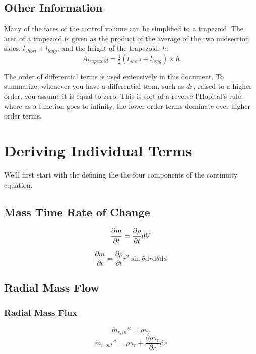 \documentclass[12pt, letterpaper, twoside]{article}
\makeatletter
\DeclareRobustCommand{\volume}{\text{\volumedash}V}
\newcommand{\volumedash}{%
  \makebox[0pt][l]{%
    \ooalign{\hfil\hphantom{$\m@th V$}\hfil\cr\kern0.08em--\hfil\cr}%
  }%
}
\makeatother
\begin{document}
\subsection{Other Information}\label{sect:otherinfo}
Many of the faces of the control volume can be simplified to a trapezoid. The area of a trapezoid is given as the product of the average of the two midsection sides, \(l_{short} + l_{long}\), and the height of the trapezoid, \(h\):
%
\begin{equation}\label{eq:traparea}
    A_{trapezoid} = \tfrac{1}{2} (l_{short} + l_{long}) \times h
\end{equation}

The order of differential terms is used extensively in this document. To summarize, whenever you have a differential term, such as \(dr\), raised to a higher order, you assume it is equal to zero. This is sort of a reverse l'Hopital's rule, where as a function goes to infinity, the lower order terms dominate over higher order terms.

\section{Deriving Individual Terms} \label{sect:deriveterms}
We'll first start with the defining the the four components of the continuity equation.

    \subsection{Mass Time Rate of Change}
        \begin{equation*}
            \frac{\partial m}{\partial t} = \frac{\partial \rho}{\partial t}d\volume
        \end{equation*}

        \begin{equation}\label{eq:dm/dt}
            \boxed{\frac{\partial m}{\partial t} = 
            \frac{\partial \rho}{\partial t} r^2 \sin\theta \textrm{d}r \textrm{d}\theta \textrm{d}\phi}
        \end{equation}

    \subsection{Radial Mass Flow}
        \subsubsection{Radial Mass Flux}
            \begin{equation}
                \dot{m}_{r,in}'' = \rho u_r
            \end{equation}
            \begin{equation}
                \dot{m}_{r,out}'' = \rho u_r  +
                \frac{\partial \rho u_r}{\partial r} \textrm{d}r
            \end{equation}
\end{document}
